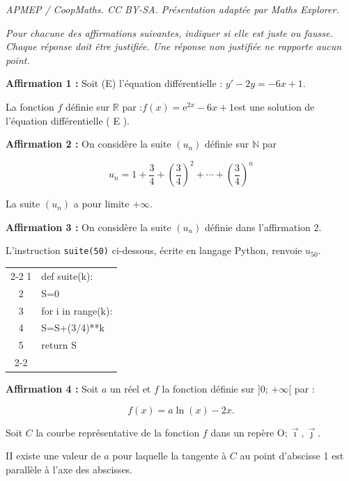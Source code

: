 \documentclass[10pt]{article}
\providecommand{\R}{\mathbb{R}}
\providecommand{\N}{\mathbb{N}}
\providecommand{\e}{{\mathrm{e}}}
\providecommand{\Oij}{\(\mathrm{O};\vec{\imath},\vec{\jmath}\)}
\begin{document}
\noindent\textit{APMEP / CoopMaths. CC BY-SA. Présentation adaptée par Maths Explorer.}\par\medskip
\emph{Pour chacune des affirmations suivantes, indiquer si elle est juste ou fausse. Chaque réponse doit être justifiée. Une réponse non justifiée ne rapporte aucun point.}

\medskip

\textbf{Affirmation 1 :} Soit (E) l'équation différentielle : $y'- 2 y= - 6 x + 1$.

La fonction $f$ définie sur $\R$ par :\quad $f(x)=\e^{2 x}-6 x + 1$\quad est une solution de l'équation différentielle ( E ).

\medskip

\textbf{Affirmation 2 :} On considère la suite $\left(u_{n}\right)$ définie sur $\N$ par

\[ u_{n}=1 + \dfrac{3}{4} + \left(\dfrac{3}{4}\right)^{2} + \cdots + \left(\dfrac{3}{4}\right)^{n}	\]

La suite $\left(u_{n}\right)$ a pour limite $ + \infty$.

\medskip

\textbf{Affirmation 3 :} On considère la suite $\left(u_{n}\right)$ définie dans l'affirmation 2.

L'instruction \texttt{suite(50)} ci-dessous, écrite en langage Python, renvoie $u_{50}$.

\begin{center}
	\begin{ttfamily}
	\begin{tabularx}{8cm}{c|X|}\cline{2-2}
		1&def suite(k):\\
		2&\quad S=0\\
		3&\quad for i in range(k):\\
		4&\qquad S=S+(3/4)**k\\
		5&\quad return S\\ \cline{2-2}
	\end{tabularx}
\end{ttfamily}
\end{center}

\medskip

\textbf{Affirmation 4 :} Soit $a$ un réel et $f$ la fonction définie sur ]0; $ + \infty[$ par :

\[f(x) = a \ln (x) - 2x.\]

Soit $C$ la courbe représentative de la fonction $f$ dans un repère \Oij.

II existe une valeur de $a$ pour laquelle la tangente à $C$ au point d'abscisse 1 est parallèle à l'axe des abscisses.
\end{document}
